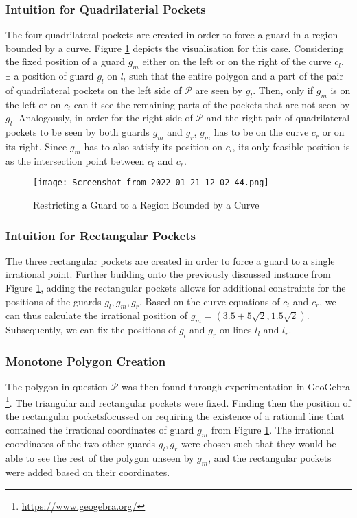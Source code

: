 \subsubsection{Intuition for Quadrilaterial Pockets}
The four quadrilateral pockets are created in order to force a guard in a region bounded by a curve. Figure \ref{fig:quadrilateral_pockets} depicts the visualisation for this case. Considering the fixed position of a guard $g_m$ either on the left or on the right of the curve $c_l$, $\exists$ a position of guard $g_l$ on $l_l$ such that the entire polygon and a part of the pair of quadrilateral pockets on the left side of $\mathcal P$ are seen by $g_l$. Then, only if $g_m$ is on the left or on $c_l$ can it see the remaining parts of the pockets that are not seen by $g_l$. Analogously, in order for the right side of $\mathcal P$ and the right pair of quadrilateral pockets to be seen by both guards $g_m$ and $g_r$, $g_m$ has to be on the curve $c_r$ or on its right. Since $g_m$ has to also satisfy its position on $c_l$, its only feasible position is as the intersection point between $c_l$ and $c_r$. 

\begin{figure}[h!]
    \centering
    \texttt{[image: Screenshot from 2022-01-21 12-02-44.png]}
    \caption{Restricting a Guard to a Region Bounded by a Curve}
    \label{fig:quadrilateral_pockets}
\end{figure}

\subsubsection{Intuition for Rectangular Pockets}
The three rectangular pockets are created in order to force a guard to a single irrational point. Further building onto the previously discussed instance from Figure \ref{fig:quadrilateral_pockets}, adding the rectangular pockets allows for additional constraints for the positions of the guards $g_l, g_m, g_r$. Based on the curve equations of $c_l$ and $c_r$, we can thus calculate the irrational position of $g_m = (3.5 + 5\sqrt 2, 1.5\sqrt 2)$. Subsequently, we can fix the positions of $g_l$ and $g_r$ on lines $l_l$ and $l_r$.

\subsubsection{Monotone Polygon Creation}
The polygon in question $\mathcal P$ was then found through experimentation in GeoGebra \footnote{\url{https://www.geogebra.org/}}. The triangular and rectangular pockets were fixed. Finding then the position of the rectangular pocketsfocussed on requiring the existence of a rational line that contained the irrational coordinates of guard $g_m$ from Figure \ref{fig:quadrilateral_pockets}. The irrational coordinates of the two other guards $g_l, g_r$ were chosen such that they would be able to see the rest of the polygon unseen by $g_m$, and the rectangular pockets were added based on their coordinates.


